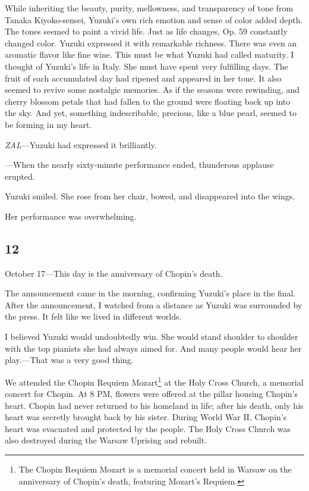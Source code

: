 \documentclass[
    a4paper,
    12pt,
    twoside,
    openany,
    UTF8,
    fontset=windows
]{ctexbook}
\begin{document}
While inheriting the beauty, purity, mellowness, and transparency of tone from Tanaka Kiyoko-sensei, Yuzuki's own rich emotion and sense of color added depth. The tones seemed to paint a vivid life. Just as life changes, Op. 59 constantly changed color. Yuzuki expressed it with remarkable richness. There was even an aromatic flavor like fine wine. This must be what Yuzuki had called maturity. I thought of Yuzuki's life in Italy. She must have spent very fulfilling days. The fruit of each accumulated day had ripened and appeared in her tone. It also seemed to revive some nostalgic memories. As if the seasons were rewinding, and cherry blossom petals that had fallen to the ground were floating back up into the sky. And yet, something indescribable, precious, like a blue pearl, seemed to be forming in my heart.

\emph{ZAL}---Yuzuki had expressed it brilliantly.

---When the nearly sixty-minute performance ended, thunderous applause erupted.

Yuzuki smiled. She rose from her chair, bowed, and disappeared into the wings.

Her performance was overwhelming.


\subsection*{12}

October 17---This day is the anniversary of Chopin's death.

The announcement came in the morning, confirming Yuzuki's place in the final. After the announcement, I watched from a distance as Yuzuki was surrounded by the press. It felt like we lived in different worlds.

I believed Yuzuki would undoubtedly win. She would stand shoulder to shoulder with the top pianists she had always aimed for. And many people would hear her play.---That was a very good thing.

We attended the Chopin Requiem Mozart\footnote{The Chopin Requiem Mozart is a memorial concert held in Warsaw on the anniversary of Chopin's death, featuring Mozart's Requiem.} at the Holy Cross Church, a memorial concert for Chopin. At 8 PM, flowers were offered at the pillar housing Chopin's heart. Chopin had never returned to his homeland in life; after his death, only his heart was secretly brought back by his sister. During World War II, Chopin's heart was evacuated and protected by the people. The Holy Cross Church was also destroyed during the Warsaw Uprising and rebuilt.
\end{document}
